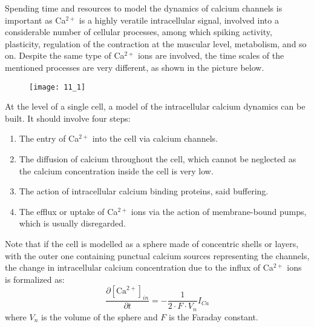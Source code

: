 Spending time and resources to model the dynamics of calcium channels is important as
Ca\(^{2+}\) is a highly veratile intracellular signal, involved into a considerable number
of cellular processes, among which spiking activity, plasticity, regulation of the contraction
at the muscular level, metabolism, and so on. Despite the same type of Ca\(^{2+}\) ions are
involved, the time scales of the mentioned processes are very different, as shown in the
picture below.
\begin{figure}[H]
    \texttt{[image: 11\_1]}
    \centering
\end{figure}
At the level of a single cell, a model of the intracellular calcium dynamics can be built.
It should involve four steps:
\begin{enumerate}
    \item The entry of Ca\(^{2+}\) into the cell via calcium channels.
    \item The diffusion of calcium throughout the cell, which cannot be neglected as the
          calcium concentration inside the cell is very low.
    \item The action of intracellular calcium binding proteins, said buffering.
    \item The efflux or uptake of Ca\(^{2+}\) ions via the action of membrane-bound pumps,
          which is usually disregarded.
\end{enumerate}
Note that if the cell is modelled as a sphere made of concentric shells or layers, with the
outer one containing punctual calcium sources representing the channels,
the change in intracellular calcium concentration due to the influx of Ca\(^{2+}\)
ions is formalized as:
\begin{equation*}
    \frac{\partial{[\text{Ca}^{2+}]_{in}}}{\partial{t}}=-\frac{1}{2\cdot{F}\cdot{V_{n}}}I_{Ca}
\end{equation*}
where \(V_{n}\) is the volume of the sphere and \(F\) is the Faraday constant.

